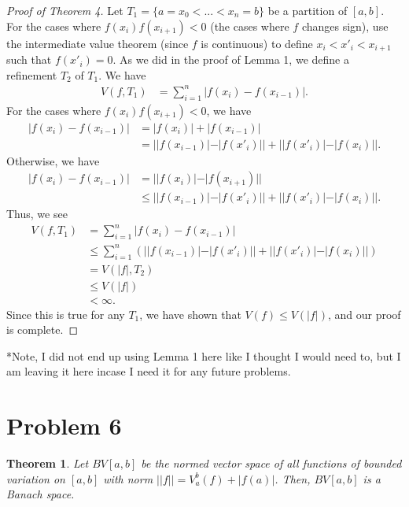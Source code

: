 \documentclass[10pt,a4paper]{article}
\theoremstyle{theorem}
\newtheorem{theorem}{Theorem}
\theoremstyle{definition}
\begin{document}
\begin{proof}[Proof of Theorem 4]
Let $T_1 = \{a = x_0 < ... < x_n = b\}$ be a partition of $[a, b]$. For the cases where $f(x_i)f(x_{i+1}) < 0$ (the cases where $f$ changes sign), use the intermediate value theorem (since $f$ is continuous) to define $x_i < x'_i < x_{i + 1}$ such that $f(x'_i) = 0$. As we did in the proof of Lemma 1, we define a refinement $T_2$ of $T_1$. We have 
\begin{align*}
V(f, T_1) &= \sum_{i=1}^n |f(x_i) - f(x_{i - 1})|.
\end{align*}
For the cases where $f(x_i)f(x_{i+1}) < 0$, we have
\begin{align*}
|f(x_i) - f(x_{i - 1})| &= |f(x_i)| + |f(x_{i - 1})|\\
&= ||f(x_{i - 1})| - |f(x'_i)|| + ||f(x'_i)| - |f(x_i)||.
\end{align*}
Otherwise, we have
\begin{align*}
|f(x_i) - f(x_{i - 1})| &= ||f(x_i)| - |f(x_{i+1})||\\
&\leq ||f(x_{i - 1})| - |f(x'_i)|| + ||f(x'_i)| - |f(x_i)||.
\end{align*}
Thus, we see
\begin{align*}
V(f, T_1) &= \sum_{i=1}^n |f(x_i) - f(x_{i - 1})|\\
&\leq \sum_{i=1}^n \left( ||f(x_{i - 1})| - |f(x'_i)|| + ||f(x'_i)| - |f(x_i)|| \right)\\
&= V(|f|, T_2)\\
&\leq V(|f|)\\
&< \infty.
\end{align*}
Since this is true for any $T_1$, we have shown that $V(f) \leq V(|f|)$, and our proof is complete.
\end{proof}
*Note, I did not end up using Lemma 1 here like I thought I would need to, but I am leaving it here incase I need it for any future problems.

\section*{Problem 6}
\begin{theorem}
Let $BV[a, b]$ be the normed vector space of all functions of bounded variation on $[a, b]$ with norm $||f|| = V_{a}^{b}(f) + |f(a)|$. Then, $BV[a, b]$ is a Banach space.
\end{theorem}
\end{document}
